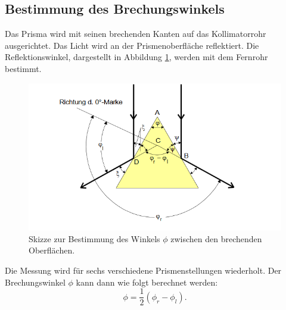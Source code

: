 \subsection{Bestimmung des Brechungswinkels}
Das Prisma wird mit seinen brechenden Kanten auf das Kollimatorrohr ausgerichtet.
Das Licht wird an der Prismenoberfläche reflektiert.
Die Reflektionswinkel, dargestellt in Abbildung \ref{fig:phi}, werden mit dem Fernrohr bestimmt.
\begin{figure}[H]
  \centering
  \includegraphics[width=\textwidth]{content/phi.png}
  \caption{Skizze zur Bestimmung des Winkels $\phi$ zwischen den brechenden Oberflächen\cite{v402}.}
  \label{fig:phi}
\end{figure}
\noindent Die Messung wird für sechs verschiedene Prismenstellungen wiederholt.
Der Brechungswinkel $\phi$ kann dann wie folgt berechnet werden:
\begin{equation}
  \label{eq:phi}
  \phi = \frac{1}{2}(\phi_r -\phi_l) .
\end{equation}

